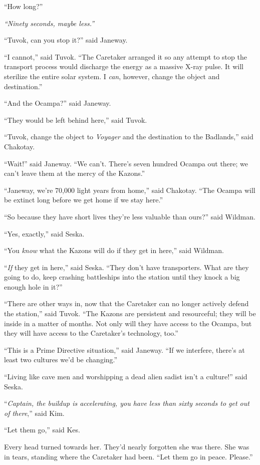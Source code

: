 \documentclass[twoside,letterpaper,12pt]{memoir}
\begin{document}
``How long?” 

\textit{``Ninety seconds, maybe less.”} 

``Tuvok, can you stop it?” said Janeway. 

``I cannot,” said Tuvok. ``The Caretaker arranged it so any attempt to stop the transport process would discharge the energy as a massive X-ray pulse. It will sterilize the entire solar system. I \textit{can}, however, change the object and destination.” 

``And the Ocampa?” said Janeway. 

``They would be left behind here,” said Tuvok. 

``Tuvok, change the object to \textit{Voyager} and the destination to the Badlands,” said Chakotay. 

``Wait!” said Janeway. ``We can’t. There’s seven hundred Ocampa out there; we can’t leave them at the mercy of the Kazons.” 

``Janeway, we’re 70,000 light years from home,” said Chakotay. ``The Ocampa will be extinct long before we get home if we stay here.” 

``So because they have short lives they’re less valuable than ours?” said Wildman. 

``Yes, exactly,” said Seska. 

``You \textit{know} what the Kazons will do if they get in here,” said Wildman. 

``\textit{If} they get in here,” said Seska. ``They don’t have transporters. What are they going to do, keep crashing battleships into the station until they knock a big enough hole in it?” 

``There are other ways in, now that the Caretaker can no longer actively defend the station,” said Tuvok. ``The Kazons are persistent and resourceful; they will be inside in a matter of months. Not only will they have access to the Ocampa, but they will have access to the Caretaker’s technology, too.” 

``This is a Prime Directive situation,” said Janeway. ``If we interfere, there’s at least two cultures we’d be changing.” 

``Living like cave men and worshipping a dead alien sadist isn’t a culture!” said Seska. 

``\textit{Captain, the buildup is accelerating, you have less than sixty seconds to get out of there},” said Kim. 

``Let them go,” said Kes. 

Every head turned towards her. They’d nearly forgotten she was there. She was in tears, standing where the Caretaker had been. ``Let them go in peace. Please.” 
\end{document}
